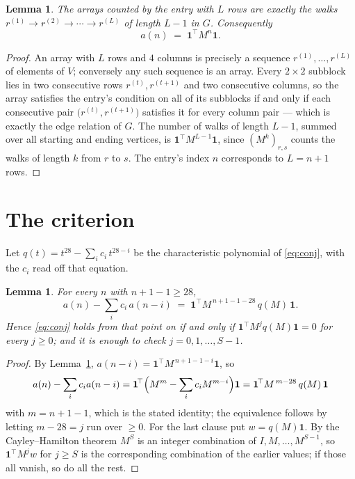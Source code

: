 \documentclass[11pt,a4paper]{article}
\theoremstyle{plain}
\newtheorem{lemma}[theorem]{Lemma}
\theoremstyle{definition}
\begin{document}
\begin{lemma}\label{lem:walk}
The arrays counted by the entry with $L$ rows are exactly the walks
$r^{(1)}\to r^{(2)}\to\cdots\to r^{(L)}$ of length $L-1$ in $G$. Consequently
\[
a(n)\;=\;\mathbf{1}^{\!\top}M^{n}\mathbf{1} .
\]
\end{lemma}

\begin{proof}
An array with $L$ rows and $4$ columns is precisely a sequence
$r^{(1)},\dots,r^{(L)}$ of elements of $V$; conversely any such sequence is an array.
Every $2\times2$ subblock lies in two consecutive rows $r^{(t)},r^{(t+1)}$ and two
consecutive columns, so the array satisfies the entry's condition on all of its subblocks
if and only if each consecutive pair $\bigl(r^{(t)},r^{(t+1)}\bigr)$ satisfies it for
every column pair --- which is exactly the edge relation of $G$. The number of walks of
length $L-1$, summed over all starting and ending vertices, is
$\mathbf{1}^{\!\top}M^{L-1}\mathbf{1}$, since $(M^{k})_{r,s}$ counts the walks of
length $k$ from $r$ to $s$. The entry's index $n$ corresponds to $L=n+1$ rows.
\end{proof}

\section{The criterion}

Let $q(t)=t^{28}-\sum_i c_i\,t^{28-i}$ be the characteristic polynomial of
\eqref{eq:conj}, with the $c_i$ read off that equation.

\begin{lemma}\label{lem:crit}
For every $n$ with $n+1-1\ge28$,
\[
a(n)-\sum_i c_i\,a(n-i)\;=\;\mathbf{1}^{\!\top}M^{\,n+1-1-28}\,q(M)\,\mathbf{1} .
\]
Hence \eqref{eq:conj} holds from that point on if and only if
$\mathbf{1}^{\!\top}M^{j}q(M)\mathbf{1}=0$ for every $j\ge0$; and it is enough to check
$j=0,1,\dots,S-1$.
\end{lemma}

\begin{proof}
By Lemma~\ref{lem:walk}, $a(n-i)=\mathbf{1}^{\!\top}M^{\,n+1-1-i}\mathbf{1}$, so
\[
a(n)-\sum_i c_i a(n-i)
=\mathbf{1}^{\!\top}\Bigl(M^{m}-\sum_i c_i M^{m-i}\Bigr)\mathbf{1}
=\mathbf{1}^{\!\top}M^{\,m-28}\,q(M)\,\mathbf{1}
\]
with $m=n+1-1$, which is the stated identity; the equivalence follows by letting
$m-28=j$ run over $\ge0$. For the last clause put $w=q(M)\mathbf{1}$. By the
Cayley--Hamilton theorem $M^{S}$ is an integer combination of $I,M,\dots,M^{S-1}$, so
$\mathbf{1}^{\!\top}M^{j}w$ for $j\ge S$ is the corresponding combination of the earlier
values; if those all vanish, so do all the rest.
\end{proof}
\end{document}
